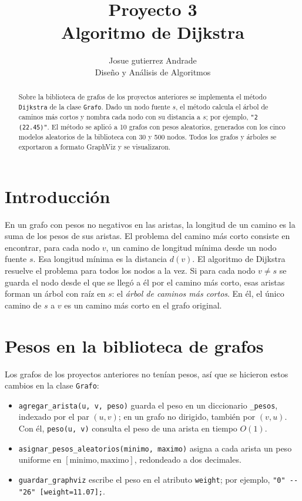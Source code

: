 \documentclass[11pt,letterpaper]{article}
\title{Proyecto 3\\Algoritmo de Dijkstra}
\author{Josue gutierrez Andrade\\[4pt]\small Diseño y Análisis de Algoritmos}
\date{}
\begin{document}
\maketitle

\begin{abstract}
Sobre la biblioteca de grafos de los proyectos anteriores se implementa el método
\texttt{Dijkstra} de la clase \texttt{Grafo}. Dado un nodo fuente $s$, el método
calcula el árbol de caminos más cortos y nombra cada nodo con su distancia a $s$;
por ejemplo, \texttt{"2 (22.45)"}. El método se aplicó a 10 grafos con pesos
aleatorios, generados con los cinco modelos aleatorios de la biblioteca con 30 y
500 nodos. Todos los grafos y árboles se exportaron a formato GraphViz y se
visualizaron.
\end{abstract}

\tableofcontents
\clearpage

\section{Introducción}

En un grafo con pesos no negativos en las aristas, la longitud de un camino es la
suma de los pesos de sus aristas. El problema del camino más corto consiste en
encontrar, para cada nodo $v$, un camino de longitud mínima desde un nodo fuente
$s$. Esa longitud mínima es la distancia $d(v)$. El algoritmo de Dijkstra resuelve
el problema para todos los nodos a la vez. Si para cada nodo $v \neq s$ se guarda
el nodo desde el que se llegó a él por el camino más corto, esas aristas forman un
árbol con raíz en $s$: el \emph{árbol de caminos más cortos}. En él, el único
camino de $s$ a $v$ es un camino más corto en el grafo original.

\section{Pesos en la biblioteca de grafos}

Los grafos de los proyectos anteriores no tenían pesos, así que se hicieron estos
cambios en la clase \texttt{Grafo}:

\begin{itemize}
    \item \texttt{agregar\_arista(u, v, peso)} guarda el peso en un diccionario
          \texttt{\_pesos}, indexado por el par $(u, v)$; en un grafo no dirigido,
          también por $(v, u)$. Con él, \texttt{peso(u, v)} consulta el peso de una
          arista en tiempo $O(1)$.
    \item \texttt{asignar\_pesos\_aleatorios(minimo, maximo)} asigna a cada arista
          un peso uniforme en $[\text{minimo}, \text{maximo}]$, redondeado a dos
          decimales.
    \item \texttt{guardar\_graphviz} escribe el peso en el atributo
          \texttt{weight}; por ejemplo, \texttt{"0" -{}- "26" [weight=11.07];}.
\end{itemize}
\end{document}
